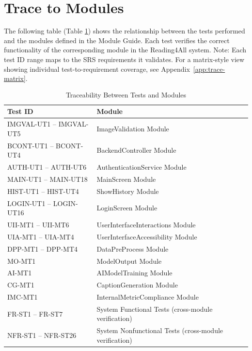 \documentclass[12pt, titlepage]{article}
\begin{document}
\section{Trace to Modules}

The following table (Table \ref{table:test-module-trace}) shows the
relationship between the tests performed
and the modules defined in the Module Guide. Each test verifies the
correct functionality of the corresponding module in the Reading4All system.
\noindent Note: Each test ID range maps to the SRS requirements it validates. For a matrix-style view showing individual test-to-requirement coverage, see Appendix~\ref{app:trace-matrix}.

\begin{table}[H]
  \centering
  \caption{Traceability Between Tests and Modules}
  \label{table:test-module-trace}
  \small
  \begin{tabularx}{0.96\textwidth}{|>{\centering\arraybackslash}p{}|X|}
    \hline
    \textbf{Test ID} & \textbf{Module} \\ \hline

    IMGVAL-UT1 -- IMGVAL-UT5 & ImageValidation Module \\ \hline
    BCONT-UT1 -- BCONT-UT4 & BackendController Module \\ \hline
    AUTH-UT1 -- AUTH-UT6 & AuthenticationService Module \\ \hline

    MAIN-UT1 -- MAIN-UT18 & MainScreen Module \\ \hline
    HIST-UT1 -- HIST-UT4 & ShowHistory Module \\ \hline
    LOGIN-UT1 -- LOGIN-UT16 & LoginScreen Module \\ \hline

    UII-MT1 -- UII-MT6 & UserInterfaceInteractions Module \\ \hline
    UIA-MT1 -- UIA-MT4 & UserInterfaceAccessibility Module \\ \hline

    DPP-MT1 -- DPP-MT4 & DataPreProcess Module \\ \hline

    MO-MT1 & ModelOutput Module \\ \hline
    AI-MT1 & AIModelTraining Module \\ \hline
    CG-MT1 & CaptionGeneration Module \\ \hline
    IMC-MT1 & InternalMetricCompliance Module \\ \hline

    FR-ST1 -- FR-ST7 & System Functional Tests (cross-module
    verification) \\ \hline
    NFR-ST1 -- NFR-ST26 & System Nonfunctional Tests (cross-module verification) \\ \hline

  \end{tabularx}
\end{table}
\end{document}
